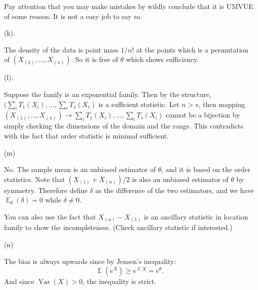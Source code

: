 \documentclass[12pt]{article}
\newcommand{\E}{\operatorname{\mathbb{E}}}
\newcommand{\1}{\mathbbm{1}}
\newcommand{\var}[1]{\operatorname{Var}\left(#1\right)}
\begin{document}
Pay attention that you may make mistakes by wildly conclude that it is UMVUE of some reason. It is not a easy job to say so.

(k). 

The density of the data is point mass $1/n!$ at the points which is a permutation of $(X_{(1)}, \ldots, X_{(n)})$. So it is free of $\theta$ which shows sufficiency.

(l).

Suppose the family is an exponential family. Then by the structure, $(\sum_i T_1(X_i) , \ldots, \sum_i T_s (X_i)$ is a sufficient statistic. Let $n > s$, then mapping $(X_{(1)}, \ldots, X_{(n)} )\rightarrow \sum_i T_1(X_i) , \ldots, \sum_i T_s (X_i)$ cannot be a bijection by simply checking the dimensions of the domain and the range. This contradicts with the fact that order statistic is minimal sufficient.

(m)

No. The sample mean is an unbiased estimator of $\theta$, and it is based on the order statistics. Note that $(X_{(1)} + X_{(n)})/2$ is also an unbiased estimator of $\theta$ by symmetry. Therefore define $\delta$ as the difference of the two estimators, and we have $\E_\theta(\delta) =0 $ while $\delta \neq 0$.

You can also use the fact that $X_{(n)} - X_{(1)}$ is an ancillary statistic in location family to show the incompleteness. (Check ancillary statistic if interested.)

(n)

The bias is always upwards since by Jensen's inequality:
$$
\E(e^X) \geq e^{\E X} = e^\theta.
$$
And since $\var{X} >0$, the inequality is strict.

\end{document}
